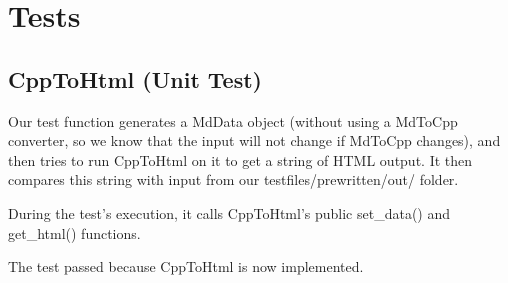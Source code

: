\section{Tests}
\subsection{CppToHtml (Unit Test)}

Our test function generates a MdData object (without using a MdToCpp converter, so we know that the input will not change if MdToCpp changes), and then tries to run CppToHtml on it to get a string of HTML output. It then compares this string with input from our testfiles/prewritten/out/  folder. 

During the test's execution, it calls CppToHtml's public set\_data() and get\_html() functions.

The test passed because CppToHtml is now implemented.

